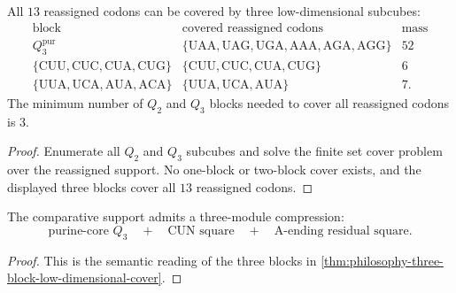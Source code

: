 \begin{theorem}
\label{thm:philosophy-three-block-low-dimensional-cover}
All $13$ reassigned codons can be covered by three low-dimensional
subcubes:
$$
\begin{array}{c|c|r}
  \text{block} & \text{covered reassigned codons} & \text{mass}\\
\hline
  Q_{3}^{\mathrm{pur}}
    & \{\mathrm{UAA},\mathrm{UAG},\mathrm{UGA},
       \mathrm{AAA},\mathrm{AGA},\mathrm{AGG}\}
    & 52\\
  \{\mathrm{CUU},\mathrm{CUC},\mathrm{CUA},\mathrm{CUG}\}
    & \{\mathrm{CUU},\mathrm{CUC},\mathrm{CUA},\mathrm{CUG}\}
    & 6\\
  \{\mathrm{UUA},\mathrm{UCA},\mathrm{AUA},\mathrm{ACA}\}
    & \{\mathrm{UUA},\mathrm{UCA},\mathrm{AUA}\}
    & 7.
\end{array}
$$
The minimum number of $Q_{2}$ and $Q_{3}$ blocks needed to cover all
reassigned codons is $3$.
\end{theorem}
\begin{proof}
Enumerate all $Q_{2}$ and $Q_{3}$ subcubes and solve the finite set
cover problem over the reassigned support. No one-block or two-block
cover exists, and the displayed three blocks cover all $13$ reassigned
codons.
\end{proof}

\begin{corollary}
\label{cor:philosophy-three-module-compression}
The comparative support admits a three-module compression:
$$
  \text{purine-core }Q_{3}
  \quad+\quad
  \text{CUN square}
  \quad+\quad
  \text{A-ending residual square}.
$$
\end{corollary}
\begin{proof}
This is the semantic reading of the three blocks in
\autoref{thm:philosophy-three-block-low-dimensional-cover}.
\end{proof}

